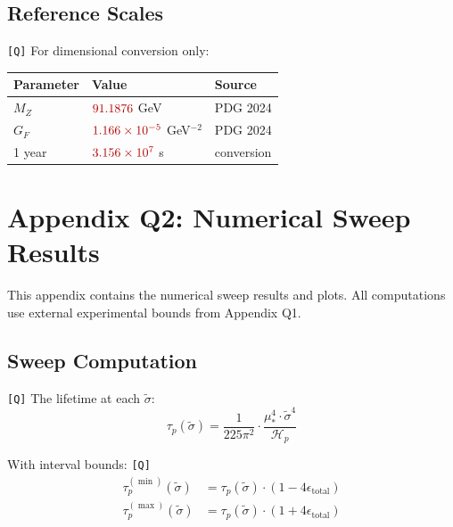 \documentclass[11pt,a4paper]{article}
\newcommand{\Qval}[1]{\textcolor{red!70!black}{#1}}
\newcommand{\tagQ}{\textcolor{red!70!black}{\texttt{[Q]}}}
\theoremstyle{definition}
\begin{document}
\subsection{Reference Scales}
\label{app:ref-scales}

\tagQ{} For dimensional conversion only:

\begin{center}
\begin{tabular}{lll}
\toprule
Parameter & Value & Source \\
\midrule
$M_Z$ & $\Qval{91.1876}$ GeV & \Qval{PDG 2024} \\
$G_F$ & $\Qval{1.166 \times 10^{-5}}$ GeV$^{-2}$ & \Qval{PDG 2024} \\
1 year & $\Qval{3.156 \times 10^7}$ s & conversion \\
\bottomrule
\end{tabular}
\end{center}

\section{Appendix Q2: Numerical Sweep Results}
\label{app:q2}

\begin{quarantinebox}
This appendix contains the numerical sweep results and plots.
All computations use external experimental bounds from Appendix Q1.
\end{quarantinebox}

\subsection{Sweep Computation}
\label{app:sweep-comp}

\tagQ{} The lifetime at each $\tilde{\sigma}$:
\begin{equation}
\label{eq:sweep-tau}
\tau_p(\tilde{\sigma}) = \frac{1}{225\pi^2} \cdot \frac{\mu_*^4 \cdot \tilde{\sigma}^4}{\mathcal{H}_p}
\end{equation}

With interval bounds: \tagQ{}
\begin{align}
\label{eq:sweep-lower}
\tau_p^{(\min)}(\tilde{\sigma}) &= \tau_p(\tilde{\sigma}) \cdot (1 - 4\epsilon_{\text{total}}) \\
\label{eq:sweep-upper}
\tau_p^{(\max)}(\tilde{\sigma}) &= \tau_p(\tilde{\sigma}) \cdot (1 + 4\epsilon_{\text{total}})
\end{align}
\end{document}
